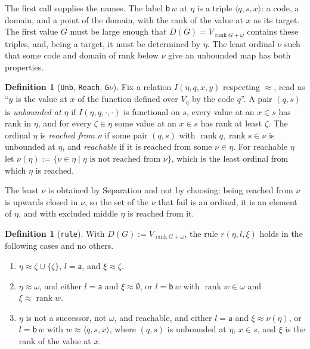 \documentclass[10pt]{article}
\theoremstyle{definition}
\newtheorem{definition}[theorem]{Definition}
\theoremstyle{remark}
\newcommand{\rk}{\operatorname{rank}}
\newcommand{\la}{\mathsf{a}}
\newcommand{\lb}{\mathsf{b}}
\newcommand{\lean}[1]{\texttt{#1}}
\begin{document}
The first call supplies the names. The label $\lb\,w$ at $\eta$ is a triple
$\langle q,s,x\rangle$: a code, a domain, and a point of the domain, with the
rank of the value at $x$ as its target. The first value $G$ must be large
enough that $D(G)=V_{\rk G+\omega}$ contains these triples, and, being a
target, it must be determined by $\eta$. The least ordinal $\nu$ such that
some code and domain of rank below $\nu$ give an unbounded map has both
properties.

\begin{definition}[\lean{Unb}, \lean{Reach}, \lean{G$\nu$}]
Fix a relation $I(\eta,q,x,y)$ respecting $\approx$, read as ``$y$ is the value
at $x$ of the function defined over $V_\eta$ by the code $q$''. A pair
$(q,s)$ is \emph{unbounded at $\eta$} if $I(\eta,q,\cdot,\cdot)$ is functional on
$s$, every value at an $x\in s$ has rank in $\eta$, and for every $\zeta\in\eta$
some value at an $x\in s$ has rank at least $\zeta$. The ordinal $\eta$ is
\emph{reached from $\nu$} if some pair $(q,s)$ with $\rk q,\rk s\in\nu$ is
unbounded at $\eta$, and \emph{reachable} if it is reached from some
$\nu\in\eta$. For reachable $\eta$ let
$\nu(\eta):=\{\nu\in\eta\mid\eta\text{ is not reached from }\nu\}$, which is the
least ordinal from which $\eta$ is reached.
\end{definition}

The least $\nu$ is obtained by Separation and not by choosing: being
reached from $\nu$ is upwards closed in $\nu$, so the set of the $\nu$ that
fail is an ordinal, it is an element of $\eta$, and with excluded middle
$\eta$ is reached from it.

\begin{definition}[\lean{rule}]\label{def:rule}
With $D(G):=V_{\rk G+\omega}$, the rule $r(\eta,l,\xi)$ holds in the following
cases and no others.
\begin{enumerate}
\item $\eta\approx\zeta\cup\{\zeta\}$, $l=\la$, and $\xi\approx\zeta$.
\item $\eta\approx\omega$, and either $l=\la$ and $\xi\approx\emptyset$, or $l=\lb\,w$ with
  $\rk w\in\omega$ and $\xi\approx\rk w$.
\item $\eta$ is not a successor, not $\omega$, and reachable, and either
  $l=\la$ and $\xi\approx\nu(\eta)$, or $l=\lb\,w$ with $w\approx\langle q,s,x\rangle$, where
  $(q,s)$ is unbounded at $\eta$, $x\in s$, and $\xi$ is the rank of the value
  at $x$.
\end{enumerate}
\end{definition}
\end{document}
